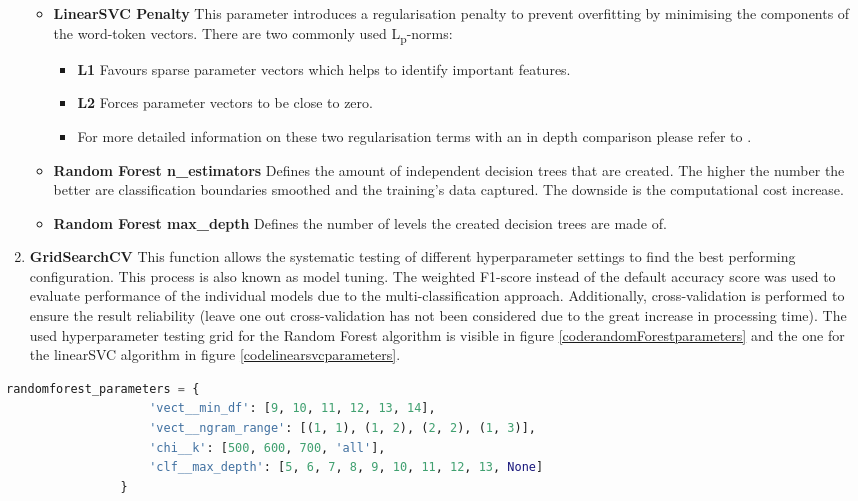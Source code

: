 \begin{enumerate}
\begin{itemize}[label={}]
        \item \textbf{LinearSVC Penalty} This parameter introduces a regularisation penalty to prevent overfitting by minimising the components of the word-token vectors. There are two commonly used L\textsubscript{p}-norms:
        \begin{itemize}[label={}]
            \item \textbf{L1} Favours sparse parameter vectors which helps to identify important features.
            \item \textbf{L2} Forces parameter vectors to be close to zero.
            \item For more detailed information on these two regularisation terms with an in depth comparison please refer to \textcite{Mazilu2011}.
        \end{itemize}
        
        \item \textbf{Random Forest n\_estimators} Defines the amount of independent decision trees that are created. The higher the number the better are classification boundaries smoothed and the training's data captured. The downside is the computational cost increase.
        
        \item \textbf{Random Forest max\_depth} Defines the number of levels the created decision trees are made of.
    \end{itemize}
    
    \item \textbf{GridSearchCV} This function allows the systematic testing of different hyperparameter settings to find the best performing configuration. This process is also known as model tuning. The weighted F1-score instead of the default accuracy score was used to evaluate performance of the individual models due to the multi-classification approach. Additionally, cross-validation is performed to ensure the result reliability (leave one out cross-validation has not been considered due to the great increase in processing time). The used hyperparameter testing grid for the Random Forest algorithm is visible in figure \ref{coderandomForestparameters} and the one for the linearSVC algorithm in figure \ref{codelinearsvcparameters}.
\end{enumerate}

\begin{lstlisting}[language=Python, caption=Tuned hyperparameters of the Random Forest fitting algorithm, label=coderandomForestparameters]
randomforest_parameters = {
                    'vect__min_df': [9, 10, 11, 12, 13, 14],
                    'vect__ngram_range': [(1, 1), (1, 2), (2, 2), (1, 3)],
                    'chi__k': [500, 600, 700, 'all'],
                    'clf__max_depth': [5, 6, 7, 8, 9, 10, 11, 12, 13, None]
                }
\end{lstlisting}

